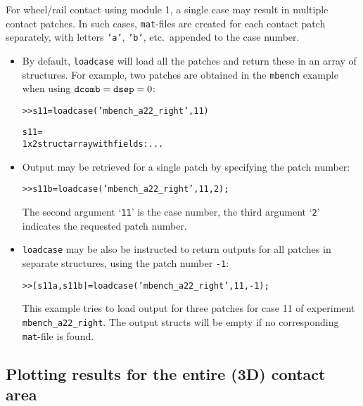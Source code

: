 \documentclass[12pt]{report}
\begin{document}
For wheel/rail contact using module 1, a single case may result in multiple
contact patches. In such cases, {\tt mat}-files are created for each
contact patch separately, with letters {\tt 'a'}, {\tt 'b'}, etc.\ appended
to the case number.
\begin{itemize}
\item By default, {\tt loadcase} will load all the patches and return these
        in an array of structures. For example, two patches are obtained in
        the {\tt mbench} example when using ${\tt dcomb}={\tt dsep}=0$:
\begin{alltt}\small
    >> s11 = loadcase('mbench_a22_right', 11)

    s11 = 
           1x2 struct array with fields: ...
\end{alltt}
\item Output may be retrieved for a single patch by specifying the patch
        number:
\begin{alltt}\small
    >> s11b = loadcase('mbench_a22_right', 11, 2);
\end{alltt}
        The second argument `{\tt 11}' is the case number, the third
        argument `{\tt 2}' indicates the requested patch number. 
\item {\tt loadcase} may be also be instructed to return outputs for all
        patches in separate structures, using the patch number {\tt -1}:
\begin{alltt}\small
    >> [s11a, s11b] = loadcase('mbench_a22_right', 11, -1);
\end{alltt}
        This example tries to load output for three patches for case 11 of
        experiment {\tt mbench\_\-a22\_\-right}. The output structs will be
        empty if no corresponding {\tt mat}-file is found.
\end{itemize}


\subsection{Plotting results for the entire (3D) contact area}
\label{sec:plot3d}
\end{document}
